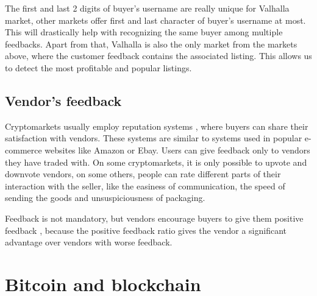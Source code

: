 \documentclass[
  digital, %
  table,   %
  lof,     %
  lot,     %
  oneside
]{fithesis3}
\begin{document}
The first and last 2 digits of buyer's username are really unique for Valhalla market,
other markets offer first and last character of buyer's username at most.
This will drastically help with recognizing the same buyer among multiple feedbacks.
Apart from that, Valhalla is also the only market from the markets above, where the customer feedback contains the
associated listing.
This allows us to detect the most profitable and popular listings.

\subsection{Vendor's feedback}

Cryptomarkets usually employ reputation systems \parencite{resnick2000reputation},
where buyers can share their satisfaction with vendors.
These systems are similar to systems used in popular e-commerce websites like Amazon or Ebay.
Users can give feedback only to vendors they have traded with.
On some cryptomarkets, it is only possible to upvote and downvote vendors,
on some others, people can rate different parts of their interaction with the seller,
like the easiness of communication,
the speed of sending the goods and unsuspiciousness of packaging.

Feedback is not mandatory, but vendors encourage buyers to give them positive feedback
\parencite{aldridge2014not}\parencite{soska2015measuring}, because the positive feedback
ratio gives the vendor a significant advantage over vendors with worse feedback.

\section{Bitcoin and blockchain}
\end{document}
